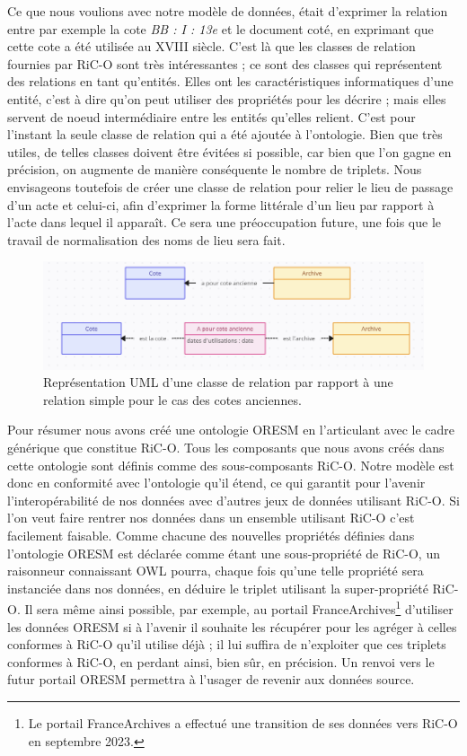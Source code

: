 \par
Ce que nous voulions avec notre modèle de données, était d'exprimer la relation entre par exemple la cote \textit{BB : I : 13e} et le document coté, en exprimant que cette cote a été utilisée au \textsc{XVIII}\ieme{} siècle. C'est là que les classes de relation fournies par RiC-O sont très intéressantes ; ce sont des classes qui représentent des relations en tant qu'entités. Elles ont les caractéristiques informatiques d'une entité, c'est à dire qu'on peut utiliser des propriétés pour les décrire ; mais elles servent de noeud intermédiaire entre les entités qu'elles relient. C'est pour l'instant la seule classe de relation qui a été ajoutée à l'ontologie. Bien que très utiles, de telles classes doivent être évitées si possible, car bien que l'on gagne en précision, on augmente de manière conséquente le nombre de triplets. Nous envisageons toutefois de créer une classe de relation pour relier le lieu de passage d'un acte et celui-ci, afin d'exprimer la forme littérale d'un lieu par rapport à l'acte dans lequel il apparaît. Ce sera une préoccupation future, une fois que le travail de normalisation des noms de lieu sera fait.
\begin{figure}[h]
    \centering
    \includegraphics[width=0.9 \linewidth]{images/Classe de relation.png}
    \caption{Représentation UML d'une classe de relation par rapport à une relation simple pour le cas des cotes anciennes.}
    \label{fig:classe_relation}
\end{figure}
\par
Pour résumer nous avons créé une ontologie ORESM en l'articulant avec le cadre générique que constitue RiC-O. Tous les composants que nous avons créés dans cette ontologie sont définis comme des sous-composants RiC-O. Notre modèle est donc en conformité avec l'ontologie qu'il étend, ce qui garantit pour l'avenir l'interopérabilité de nos données avec d'autres jeux de données utilisant RiC-O. Si l'on veut faire rentrer nos données dans un ensemble utilisant RiC-O c'est facilement faisable.  Comme chacune des nouvelles propriétés définies dans l'ontologie ORESM est déclarée comme étant une sous-propriété de RiC-O, un raisonneur connaissant OWL pourra, chaque fois qu'une telle propriété sera instanciée dans nos données, en déduire le triplet utilisant la super-propriété RiC-O. Il sera même ainsi possible, par exemple, au portail FranceArchives\footnote{Le portail FranceArchives a effectué une transition de ses données vers RiC-O en septembre 2023.} d'utiliser les données ORESM si à l'avenir il souhaite les récupérer pour les agréger à celles conformes à RiC-O qu'il utilise déjà ; il lui suffira de n'exploiter que ces triplets conformes à RiC-O, en perdant ainsi, bien sûr, en précision.  Un renvoi vers le futur portail ORESM permettra à l'usager de revenir aux données source.

